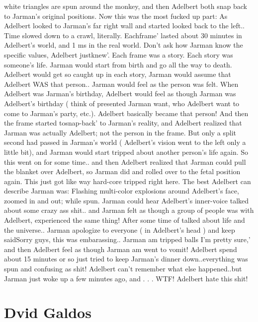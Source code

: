 \documentclass[12pt]{book}
\begin{document}
white triangles are spun around the monkey, and then Adelbert both snap back to Jarman's original positions. Now this was the most fucked up part: As Adelbert looked to Jarman's far right wall and started looked back to the left.. Time slowed down to a crawl, literally. Eachframe' lasted about 30 minutes in Adelbert's world, and 1 ms in the real world. Don't ask how Jarman know the specific values, Adelbert justknew'. Each frame was a story. Each story was someone's life. Jarman would start from birth and go all the way to death. Adelbert would get so caught up in each story, Jarman would assume that Adelbert WAS that person.. Jarman would feel as the person was felt. When Adelbert was Jarman's birthday, Adelbert would feel as though Jarman was Adelbert's birthday ( think of presented Jarman want, who Adelbert want to come to Jarman's party, etc.). Adelbert basically became that person! And then the frame started tosnap-back' to Jarman's reality, and Adelbert realized that Jarman was actually Adelbert; not the person in the frame. But only a split second had passed in Jarman's world ( Adelbert's vision went to the left only a little bit), and Jarman would start tripped about another person's life again. So this went on for some time.. and then Adelbert realized that Jarman could pull the blanket over Adelbert, so Jarman did and rolled over to the fetal position again. This just got like way hard-core tripped right here. The best Adelbert can describe Jarman was: Flashing multi-color explosions around Adelbert's face, zoomed in and out; while spun. Jarman could hear Adelbert's inner-voice talked about some crazy ass shit.. and Jarman felt as though a group of people was with Adelbert, experienced the same thing! After some time of talked about life and the universe.. Jarman apologize to everyone ( in Adelbert's head ) and keep saidSorry guys, this was embarassing.. Jarman am tripped balls I'm pretty sure,' and then Adelbert feel as though Jarman am went to vomit! Adelbert spend about 15 minutes or so just tried to keep Jarman's dinner down..everything was spun and confusing as shit! Adelbert can't remember what else happened..but Jarman just woke up a few minutes ago, and . . .  WTF! Adelbert hate this shit!



\chapter{Dvid Galdos}
\end{document}
